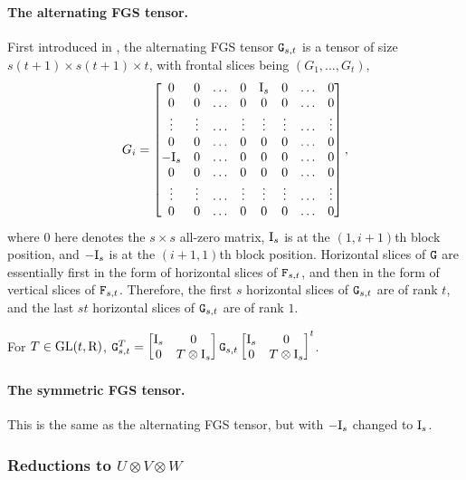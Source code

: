 \paragraph{The alternating FGS tensor.} First introduced in \cite{GQT}, the alternating FGS tensor $\mathtt{G}_{s, t}$ is a tensor of size $s(t+1)\times s(t+1)\times t$, with frontal slices being $(G_1, \dots, G_t)$,
$$G_i=\begin{bmatrix}
	0 & 0 & \dots & 0 & \mathrm{I}_{s} & 0 & \dots & 0 \\
	0 & 0 &  \dots & 0 & 0 & 0 & \dots & 0 \\
	\vdots & \vdots &  \dots & \vdots & \vdots & \vdots & \dots & \vdots \\
	0 & 0 &  \dots & 0 & 0 & 0 & \dots & 0 \\
	-\mathrm{I}_{s} & 0 &  \dots & 0 & 0 & 0 & \dots & 0 \\
	0 & 0 &  \dots & 0 & 0 & 0 & \dots & 0 \\
	\vdots& \vdots & \dots & \vdots & \vdots & \vdots & \dots & \vdots \\
	0 & 0 &  \dots & 0 & 0 & 0 & \dots & 0 
\end{bmatrix},$$
where $0$ here denotes the $s\times s$ all-zero 
matrix, $\mathrm{I}_{s}$ is at the $(1, i+1)$th block position, and $-\mathrm{I}_{s}$ is at the 
$(i+1, 1)$th block position. Horizontal slices of $\mathtt{G}$ are essentially first in the form of horizontal slices of $\mathtt{F}_{s, t}$, and then in the form of vertical slices of $\mathtt{F}_{s, t}$. Therefore, the first $s$ horizontal slices of $\mathtt{G}_{s, t}$ are of rank $t$, and the last $st$ horizontal slices of $\mathtt{G}_{s, t}$ are of rank $1$.
\begin{fact}\label{fact:alt-FGS-tensor}
For $T\in\mathrm{GL}(t, \mathrm{R})$, $\mathtt{G}_{s, t}^T=\begin{bmatrix}
	\mathrm{I}_s & 0 \\
	0 & T\otimes \mathrm{I}_s
\end{bmatrix}\mathtt{G}_{s, t}
\begin{bmatrix}
	\mathrm{I}_s & 0 \\
	0 & T\otimes \mathrm{I}_s
\end{bmatrix}^t$.
\end{fact}

\paragraph{The symmetric FGS tensor.} This is the same as the alternating FGS tensor, but with $-\mathrm{I}_{s}$ changed to $\mathrm{I}_s$.

\subsubsection{Reductions to $U\otimes V\otimes W$}\label{subsec:UVW}


